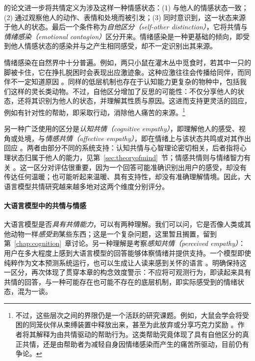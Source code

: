 \citet{devignemont2006empathic} 的论文进一步将共情定义为涉及这样一种情感状态：(1) 与他人的情感状态一致；(2) 通过观察他人的动作、表情和处境而被引发；(3) 同时意识到，这一状态来源于他人的状态。最后一个条件称为\emph{自他区分（self-other distinction）}，它将共情与\emph{情绪感染（emotional contagion）}区分开来。情绪感染是一种更基础的倾向，即受到他人情感状态的感染并与之产生相同感受，却不一定识别出其来源。

情绪感染在自然界中十分普遍。例如，两只小鼠在灌木丛中觅食时，若其中一只的脚被卡住，它在挣扎脱困时会表现出应激迹象。这种应激往往会传播给同伴，而同伴不一定知道原因 \citep{preston2002empathy}。同样的低层机制也存在于认知能力更复杂的物种中，包括我们这样的灵长类动物。不过，自他区分增加了反思的可能性：不仅分享他人的状态，还将其识别为他人的状态，并理解其性质与原因。这进而支持更灵活的回应，例如有针对性的帮助，即采取行动，消除他人痛苦的来源。\footnote{不过，这些层次之间的界限仍是一个活跃的研究课题。例如，大鼠会学会将受困的同笼伙伴从束缚装置中释放出来，甚至为此放弃或分享巧克力奖励 \citep{bartal2011empathy}。作者将其解释为由共情驱动的帮助行为。这类帮助究竟体现了具有自他区分的真正共情，还是由帮助者为减轻自身因情绪感染而产生的痛苦所驱动，目前仍有争论。}

另一种广泛使用的区分是\emph{认知共情（cognitive empathy）}，即理解他人的感受、视角或处境，与\emph{情感共情（affective empathy）}，即在情绪上与该状态共鸣或对其作出回应 \citep{dvash2014theory}。两者由部分不同的系统支持：认知共情与心智理论密切相关，后者指将心理状态归属于他人的能力，见第~\ref{sec:theoryofmind}~节；情感共情则与情绪智力有关 \citep{dvash2014theory, preckel2018interaction}。这一区分对评估很重要，因为一个回答可能准确识别出用户的感受，却没有传达任何温暖；也可能听起来温暖、具有支持性，却没有准确理解情境。因此，大语言模型共情研究越来越多地对这两个维度分别评分。

\paragraph{大语言模型中的共情与情感}
大语言模型是否{\em 具有共情能力}，可以有两种理解。我们可以问，它是否像人类或其他动物一样{\em 感受到}某些东西；这是一个复杂问题，这里暂且搁置，留到第~\ref{chap:cognition}~章讨论。另一种理解是考察\emph{感知共情（perceived empathy）}：用户在多大程度上感到大语言模型的回答能够体察情绪并提供支持。一个模型即使纯粹作为文本预测系统运行，也可以生成让人读来感到关怀的语言 \citep{sorin2024large}。明确保持这一区分，再次体现了贯穿本章的构念效度警示：不应将可观测行为，即读起来具有共情的回答，与一种可能存在也可能不存在的底层机制，即实际感受到的情绪状态，混为一谈。


